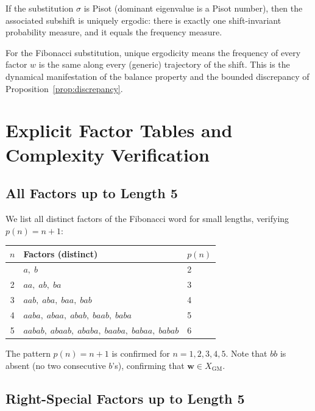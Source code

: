 \begin{theorem}\label{thm:pisot-unique-ergodic}
  If the substitution \(\sigma\) is Pisot (dominant eigenvalue is a
  Pisot number), then the associated subshift is uniquely ergodic:
  there is exactly one shift-invariant probability measure, and it
  equals the frequency measure.
\end{theorem}

For the Fibonacci substitution, unique ergodicity means the frequency
of every factor \(w\) is the same along every (generic) trajectory
of the shift.  This is the dynamical manifestation of the balance
property and the bounded discrepancy of Proposition~\ref{prop:discrepancy}.

\section{Explicit Factor Tables and Complexity Verification}
\label{sec:ch19-factor-tables}

\subsection{All Factors up to Length 5}
\label{subsec:ch19-factors-5}

We list all distinct factors of the Fibonacci word for small lengths,
verifying \(p(n)=n+1\):

\medskip
\begin{longtable}[]{@{}cll@{}}
\toprule
\(n\) & Factors (distinct) & \(p(n)\) \\
\midrule
\endhead
\bottomrule
\endlastfoot
1 & \(a,\;b\) & 2 \\
2 & \(aa,\;ab,\;ba\) & 3 \\
3 & \(aab,\;aba,\;baa,\;bab\) & 4 \\
4 & \(aaba,\;abaa,\;abab,\;baab,\;baba\) & 5 \\
5 & \(aabab,\;abaab,\;ababa,\;baaba,\;babaa,\;babab\) & 6 \\
\end{longtable}
\medskip

The pattern \(p(n)=n+1\) is confirmed for \(n=1,2,3,4,5\).  Note
that \(bb\) is absent (no two consecutive \(b\)'s), confirming that
\(\mathbf{w}\in X_{\mathrm{GM}}\).

\subsection{Right-Special Factors up to Length 5}
\label{subsec:ch19-rs-5}

